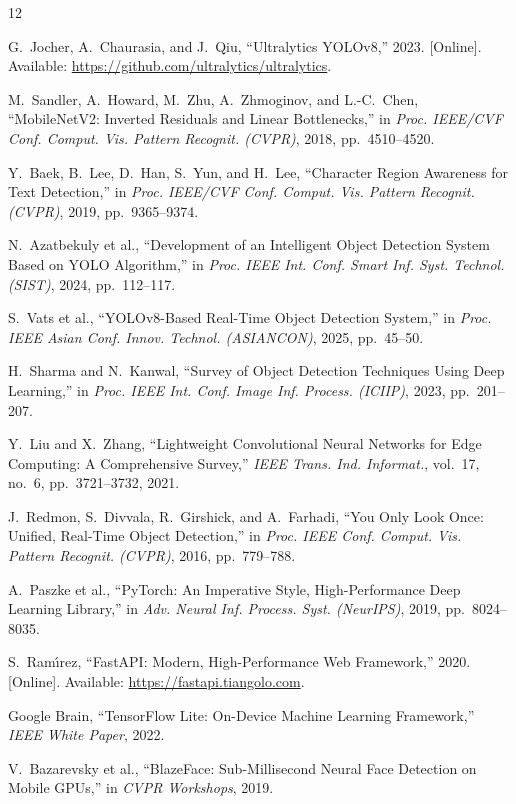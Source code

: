 \documentclass[conference]{IEEEtran}
\begin{document}
\begin{thebibliography}{12}

G.~Jocher, A.~Chaurasia, and J.~Qiu, ``Ultralytics YOLOv8,'' 2023.
[Online]. Available: \url{https://github.com/ultralytics/ultralytics}.

M.~Sandler, A.~Howard, M.~Zhu, A.~Zhmoginov, and L.-C.~Chen,
``MobileNetV2: Inverted Residuals and Linear Bottlenecks,''
in \emph{Proc. IEEE/CVF Conf. Comput. Vis. Pattern Recognit. (CVPR)},
2018, pp.~4510--4520.

Y.~Baek, B.~Lee, D.~Han, S.~Yun, and H.~Lee,
``Character Region Awareness for Text Detection,''
in \emph{Proc. IEEE/CVF Conf. Comput. Vis. Pattern Recognit. (CVPR)},
2019, pp.~9365--9374.

N.~Azatbekuly et al.,
``Development of an Intelligent Object Detection System Based on YOLO
Algorithm,''
in \emph{Proc. IEEE Int. Conf. Smart Inf. Syst. Technol. (SIST)}, 2024,
pp.~112--117.

S.~Vats et al.,
``YOLOv8-Based Real-Time Object Detection System,''
in \emph{Proc. IEEE Asian Conf. Innov. Technol. (ASIANCON)}, 2025,
pp.~45--50.

H.~Sharma and N.~Kanwal,
``Survey of Object Detection Techniques Using Deep Learning,''
in \emph{Proc. IEEE Int. Conf. Image Inf. Process. (ICIIP)}, 2023,
pp.~201--207.

Y.~Liu and X.~Zhang,
``Lightweight Convolutional Neural Networks for Edge Computing:
A Comprehensive Survey,''
\emph{IEEE Trans. Ind. Informat.}, vol.~17, no.~6,
pp.~3721--3732, 2021.

J.~Redmon, S.~Divvala, R.~Girshick, and A.~Farhadi,
``You Only Look Once: Unified, Real-Time Object Detection,''
in \emph{Proc. IEEE Conf. Comput. Vis. Pattern Recognit. (CVPR)},
2016, pp.~779--788.

A.~Paszke et al.,
``PyTorch: An Imperative Style, High-Performance Deep Learning Library,''
in \emph{Adv. Neural Inf. Process. Syst. (NeurIPS)}, 2019,
pp.~8024--8035.

S.~Ram{\'\i}rez, ``FastAPI: Modern, High-Performance Web Framework,'' 2020.
[Online]. Available: \url{https://fastapi.tiangolo.com}.

Google Brain,
``TensorFlow Lite: On-Device Machine Learning Framework,''
\emph{IEEE White Paper}, 2022.

V.~Bazarevsky et al.,
``BlazeFace: Sub-Millisecond Neural Face Detection on Mobile GPUs,''
in \emph{CVPR Workshops}, 2019.

\end{thebibliography}
\end{document}
